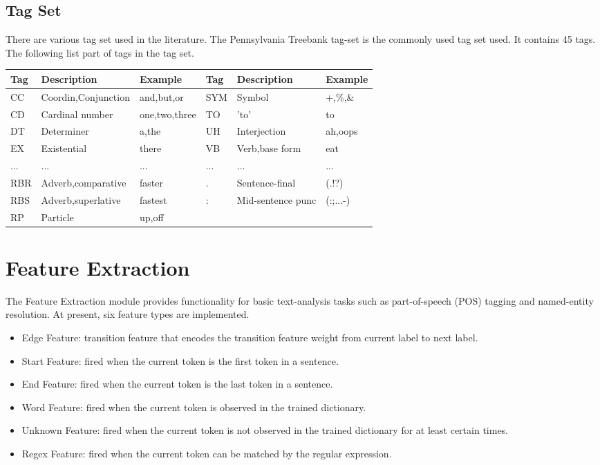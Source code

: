 \subsection{Tag Set}
There are various tag set used in the literature. The Pennsylvania Treebank tag-set is the commonly used tag set used. It contains
45 tags. The following list part of tags in the tag set.
\begin{tabular}{lll||lll}
  Tag & Description         & Example       & Tag & Description         & Example\\
  \hline                        
  CC  & Coordin,Conjunction & and,but,or    & SYM & Symbol              & +,\%,\&\\
  CD  & Cardinal number     & one,two,three & TO  & 'to'                & to\\
  DT  & Determiner          & a,the         & UH  & Interjection        & ah,oops\\
  EX  & Existential         & there         & VB  & Verb,base form      & eat\\
  ... & ...                 & ...           & ... & ...                 & ...\\
  RBR & Adverb,comparative  & faster        & .   & Sentence-final      & (.!?)\\
  RBS & Adverb,superlative  & fastest       & :   & Mid-sentence punc   & (:;...-)\\
  RP  & Particle            & up,off        &     &                     &\\
  \hline  
\end{tabular}

\section{Feature Extraction}
The Feature Extraction module provides functionality for basic text-analysis
tasks such as part-of-speech (POS) tagging and named-entity resolution.
At present, six feature types are implemented.
    \begin{itemize}
    \item Edge Feature: transition feature that encodes the transition feature weight from current label to next label.
    \item Start Feature: fired when the current token is the first token in a sentence.
    \item End Feature: fired when the current token is the last token in a sentence.
    \item Word Feature: fired when the current token is observed in the trained dictionary.
    \item Unknown Feature: fired when the current token is not observed in the trained dictionary for at least certain times.
    \item Regex Feature: fired when the current token can be matched by the regular expression.
    \end{itemize}

